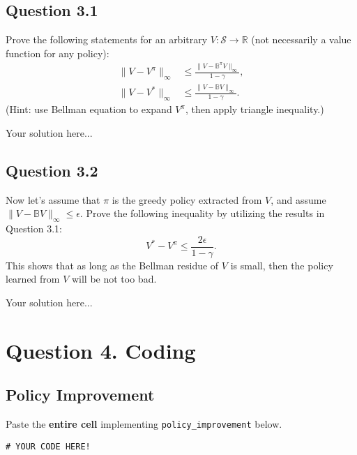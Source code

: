 \documentclass[12pt]{article}
\newcommand*{\bo}{\mathbb{B}}
\begin{document}
\subsection*{Question 3.1}Prove the following statements for an arbitrary $V: \mathcal{S} \rightarrow \mathbb{R}$ (not necessarily a value function for any policy):
\begin{align*}
    \|V - V^\pi \|_\infty &\leq \frac{\|V - \bo^\pi V\|_\infty}{1-\gamma},\\
    \|V - V^* \|_\infty &\leq \frac{\|V - \bo V\|_\infty}{1-\gamma}.
\end{align*}
(Hint: use Bellman equation to expand $V^\pi$, then apply triangle inequality.)
\begin{solution}
    Your solution here...
\end{solution}
\subsection*{Question 3.2} Now let's assume that $\pi$ is the greedy policy extracted from $V$, and assume $\|V - \bo V\|_\infty \leq \epsilon$. Prove the following inequality by utilizing the results in Question 3.1: 
$$V^* - V^{\pi} \leq  \frac{2\epsilon}{1-\gamma}.$$
This shows that as long as the Bellman residue of $V$ is small, then the policy learned from $V$ will be not too bad. 
\begin{solution}
    Your solution here...
\end{solution}
\section*{Question 4. Coding}
\subsection*{Policy Improvement}
Paste the \textbf{entire cell}  implementing \texttt{policy\_improvement} below.
\begin{solution}
    \begin{verbatim}
# YOUR CODE HERE!
    \end{verbatim}
\end{solution}
\end{document}
